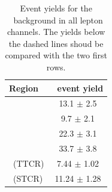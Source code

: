 	
	\begin{table}[htbp]
		\begin{center}
						\caption{Event yields for the \ttbar\ background in all lepton channels. The yields below the dashed lines shoud be compared with the two first rows. }
			
			\begin{tabular} {l c}
				\toprule
				Region & \ttbar\ event yield  \\ 
				\midrule 
				\STSR & 13.1 $\pm $ 2.5 \\
				\TTSR & 9.7 $\pm $ 2.1 \\
				\TTCR & 22.3 $\pm $ 3.1 \\
				\STCR & 33.7 $\pm $ 3.8 \B\\
				\hdashline
				\TTSR\ (TTCR) & 7.44 $\pm $ 1.02 \T \\
				\STSR\ (STCR)& 11.24 $\pm $ 1.28 \\  				 
				\bottomrule
			\end{tabular}

		\end{center}
	\label{tab:applied}
	\end{table}
\clearpage
